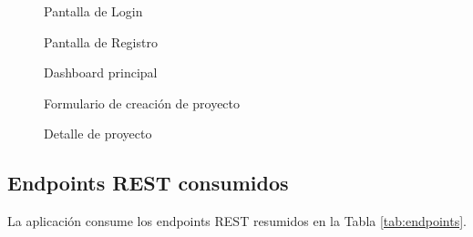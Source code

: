 \documentclass[12pt, a4paper]{article} %
\begin{document}
\begin{figure}[h]
    \centering
    \caption{Pantalla de Login}
    \label{fig:login}
\end{figure}

\begin{figure}[h]
    \centering
    \caption{Pantalla de Registro}
    \label{fig:register}
\end{figure}

\begin{figure}[h]
    \centering
    \caption{Dashboard principal}
    \label{fig:dashboard}
\end{figure}

\begin{figure}[h]
    \centering
    \caption{Formulario de creación de proyecto}
    \label{fig:add-project}
\end{figure}

\begin{figure}[h]
    \centering
    \caption{Detalle de proyecto}
    \label{fig:detail}
\end{figure}

\subsection{Endpoints REST consumidos}
La aplicación consume los endpoints REST resumidos en la
Tabla \ref{tab:endpoints}.
\end{document}
